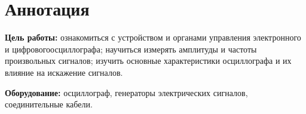 \section{Аннотация}
\textbf{Цель работы:} ознакомиться с устройством и органами управления электронного и цифровогоосциллографа; научиться измерять амплитуды и частоты произвольных сигналов; изучить основные характеристики осциллографа и их влияние на искажение сигналов.

\textbf{Оборудование:} осциллограф, генераторы электрических сигналов, соединительные кабели.


